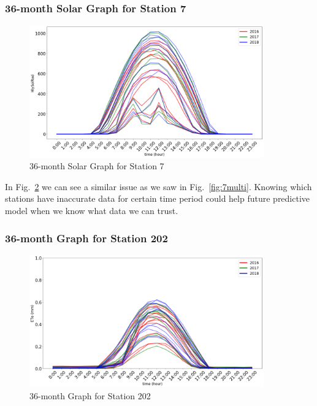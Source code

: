 \begin{frame}
\frametitle{36-month Solar Graph for Station 7}
\centering
\begin{figure}
	\includegraphics[width=0.9\textwidth]{images/3year7solar.png}
	\caption{36-month Solar Graph for Station 7}\label{fig:solar}
\end{figure}
\end{frame}

\begin{frame}
	In Fig.~\ref{fig:202multi} we can see a similar issue as we saw in Fig.~\ref{fig:7multi}. Knowing which stations have inaccurate data for certain time period could help future predictive model when we know what data we can trust.
\end{frame}

\begin{frame}
\frametitle{36-month Graph for Station 202}
\centering
\begin{figure}
	\includegraphics[width=0.9\textwidth]{images/202multi.png}
	\caption{36-month Graph for Station 202}\label{fig:202multi}
\end{figure}
\end{frame}

